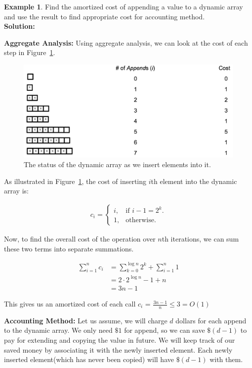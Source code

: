 \documentclass[11pt]{article}
\theoremstyle{definition}
\newtheorem{exmp}{Example}[section]
\begin{document}
\begin{exmp}
Find the amortized cost of appending a value to a dynamic array and use the result to find appropriate cost for accounting method.\\

\textbf{Solution:}

\textbf{Aggregate Analysis:}
Using aggregate analysis, we can look at the cost of each step in Figure~\ref{fig:dynamic}.  

\begin{figure}[tbh]
\centering
\includegraphics[scale=0.5]{figures/dynamic}
\caption{The status of the dynamic array as we insert elements into it.}
\label{fig:dynamic}
\end{figure}

As illustrated in Figure~\ref{fig:dynamic}, the cost of inserting $i$th element into the dynamic array is:

\begin{eqnarray*}
c_i = \begin{cases}
  i, & \text{if $i-1=2^k$}. \\
  1, & \text{otherwise}.
\end{cases}
\end{eqnarray*}

Now, to find the overall cost of the operation over $n$th iterations, we can sum these two terms into separate summations.

\begin{align*}
\sum_{i=1}^n c_i &= \sum_{k=0}^{\log{n}} 2^k + \sum_{i=1}^{n} 1 \\
&= 2\cdot2^{\log{n}} - 1 + n \\
&= 3n - 1
\end{align*}

This gives us an amortized cost of each call $\hat{c}_i$ = $\frac{3n-1}{n} \le 3 = O(1)$

\textbf{Accounting Method:}
Let us assume, we will charge $d$ dollars for each append to the dynamic array. We only need $\$1$ for append, so we can save $\$(d-1)$ to pay for extending and copying the value in future. We will keep track of our saved money by associating it with the newly inserted element. Each newly inserted element(which has never been copied) will have $\$(d-1)$ with them.\\


\end{exmp}
\end{document}
